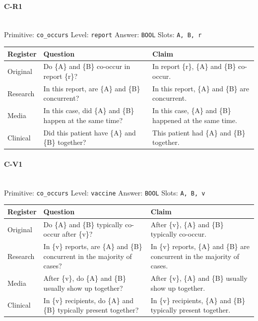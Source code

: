 \documentclass[11pt]{article}
\begin{document}
\paragraph{\textbf{C-R1}}\mbox{}\\
Primitive: \texttt{co\_occurs} \quad Level: \texttt{report} \quad Answer: \texttt{BOOL} \quad Slots: \texttt{A, B, r}\\[2pt]
\begin{tabularx}{\linewidth}{@{}l L L@{}}
\toprule
\textbf{Register} & \textbf{Question} & \textbf{Claim} \\
\midrule
Original & Do \{A\} and \{B\} co-occur in report \{r\}? & In report \{r\}, \{A\} and \{B\} co-occur. \\
Research & In this report, are \{A\} and \{B\} concurrent? & In this report, \{A\} and \{B\} are concurrent. \\
Media & In this case, did \{A\} and \{B\} happen at the same time? & In this case, \{A\} and \{B\} happened at the same time. \\
Clinical & Did this patient have \{A\} and \{B\} together? & This patient had \{A\} and \{B\} together. \\
\bottomrule
\end{tabularx}
\vspace{4pt}

\paragraph{\textbf{C-V1}}\mbox{}\\
Primitive: \texttt{co\_occurs} \quad Level: \texttt{vaccine} \quad Answer: \texttt{BOOL} \quad Slots: \texttt{A, B, v}\\[2pt]
\begin{tabularx}{\linewidth}{@{}l L L@{}}
\toprule
\textbf{Register} & \textbf{Question} & \textbf{Claim} \\
\midrule
Original & Do \{A\} and \{B\} typically co-occur after \{v\}? & After \{v\}, \{A\} and \{B\} typically co-occur. \\
Research & In \{v\} reports, are \{A\} and \{B\} concurrent in the majority of cases? & In \{v\} reports, \{A\} and \{B\} are concurrent in the majority of cases. \\
Media & After \{v\}, do \{A\} and \{B\} usually show up together? & After \{v\}, \{A\} and \{B\} usually show up together. \\
Clinical & In \{v\} recipients, do \{A\} and \{B\} typically present together? & In \{v\} recipients, \{A\} and \{B\} typically present together. \\
\bottomrule
\end{tabularx}
\vspace{4pt}
\end{document}
